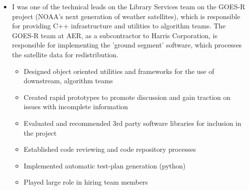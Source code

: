 \documentclass[11pt,a4paper,sans]{moderncv}        %
\begin{document}
\vspace{6pt}

\begin{itemize}

  \item{}

    I was one of the technical leads on the Library Services team on the GOES-R
    project (NOAA's next generation of weather satellites), which is responsible
    for providing C++ infrastructure and utilities to algorithm teams. The
    GOES-R team at AER, as a subcontractor to Harris Corporation, is responsible
    for implementing the 'ground segment' software, which processes the
    satellite data for redistribution.

    \begin{itemize}
      \item{Designed object oriented utilities and frameworks for the use of downstream, algorithm teams}
      \item{Created rapid prototypes to promote discussion and gain traction on issues with incomplete information}
      \item{Evaluated and recommended 3rd party software libraries for inclusion in the project}
      \item{Established code reviewing and code repository processes}
      \item{Implemented automatic test-plan generation (python)}
      \item{Played large role in hiring team members}
    \end{itemize}

\end{itemize}


\vspace{6pt}
\end{document}
